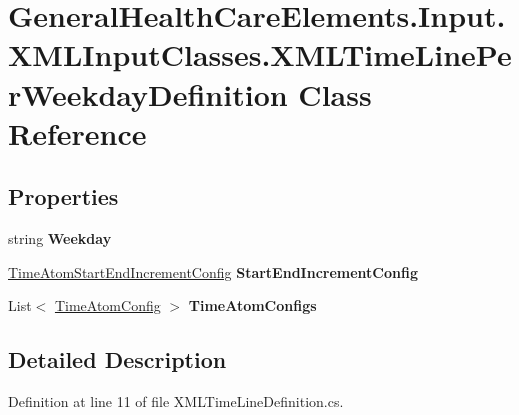 \hypertarget{class_general_health_care_elements_1_1_input_1_1_x_m_l_input_classes_1_1_x_m_l_time_line_per_weekday_definition}{}\section{General\+Health\+Care\+Elements.\+Input.\+X\+M\+L\+Input\+Classes.\+X\+M\+L\+Time\+Line\+Per\+Weekday\+Definition Class Reference}
\label{class_general_health_care_elements_1_1_input_1_1_x_m_l_input_classes_1_1_x_m_l_time_line_per_weekday_definition}
\subsection*{Properties}
\begin{DoxyCompactItemize}
\item 
string {\bfseries Weekday}\hypertarget{class_general_health_care_elements_1_1_input_1_1_x_m_l_input_classes_1_1_x_m_l_time_line_per_weekday_definition_ac914fe2a694c9b639bd3ae06ada55798}{}\label{class_general_health_care_elements_1_1_input_1_1_x_m_l_input_classes_1_1_x_m_l_time_line_per_weekday_definition_ac914fe2a694c9b639bd3ae06ada55798}

\item 
\hyperlink{class_general_health_care_elements_1_1_booking_models_1_1_time_atom_start_end_increment_config}{Time\+Atom\+Start\+End\+Increment\+Config} {\bfseries Start\+End\+Increment\+Config}\hypertarget{class_general_health_care_elements_1_1_input_1_1_x_m_l_input_classes_1_1_x_m_l_time_line_per_weekday_definition_a9537a2b8272eac93927ee1371beeec07}{}\label{class_general_health_care_elements_1_1_input_1_1_x_m_l_input_classes_1_1_x_m_l_time_line_per_weekday_definition_a9537a2b8272eac93927ee1371beeec07}

\item 
List$<$ \hyperlink{class_general_health_care_elements_1_1_booking_models_1_1_time_atom_config}{Time\+Atom\+Config} $>$ {\bfseries Time\+Atom\+Configs}\hypertarget{class_general_health_care_elements_1_1_input_1_1_x_m_l_input_classes_1_1_x_m_l_time_line_per_weekday_definition_afda21754261669cb3e6eb16d503c62ee}{}\label{class_general_health_care_elements_1_1_input_1_1_x_m_l_input_classes_1_1_x_m_l_time_line_per_weekday_definition_afda21754261669cb3e6eb16d503c62ee}

\end{DoxyCompactItemize}


\subsection{Detailed Description}


Definition at line 11 of file X\+M\+L\+Time\+Line\+Definition.\+cs.

